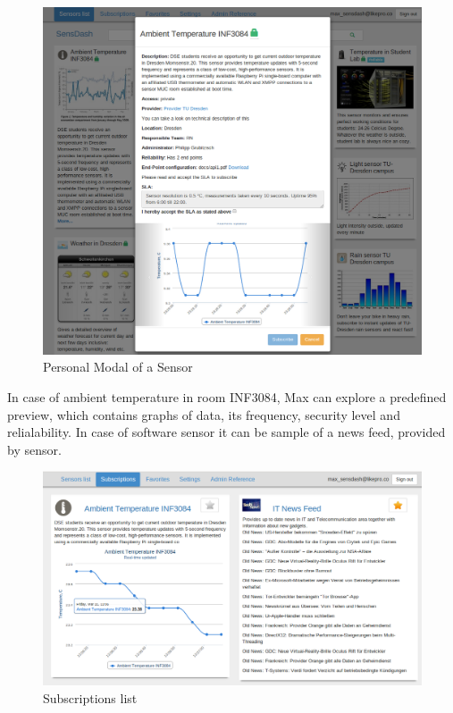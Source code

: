 \begin{figure}[!ht]
\centering
\includegraphics[scale=0.6]{Screenshots/UseCaseWelcome.png}   
\caption[Personal Modal of a Sensor]{Personal Modal of a Sensor}
\label{img:modal}                       
\end{figure}
 
 In case of ambient temperature in room INF3084, Max can explore a predefined preview, which contains graphs of data, its frequency, security level and relialability. In case of software sensor it can be sample of a news feed, provided by sensor. 

\begin{figure}[!ht]
\centering
\includegraphics[scale=0.6]{Screenshots/UseCaseScreenshot4.png}   
\caption[Personal Subscribed Sensor]{Subscriptions list} 
\label{img:subscriptions}                        
\end{figure}

